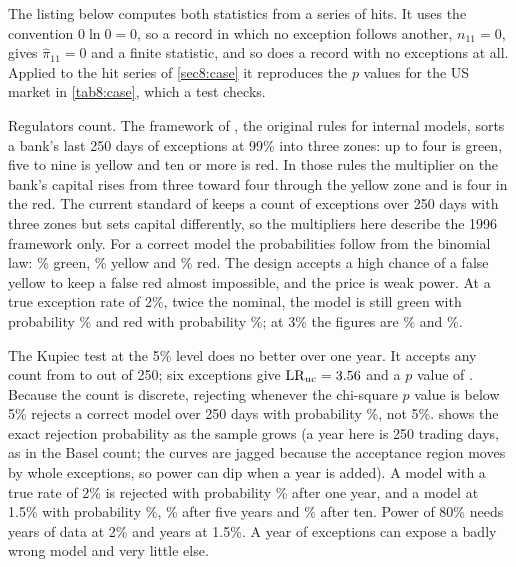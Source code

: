 \begin{chapterrefs}
The listing below computes both statistics from a series of hits. It uses the convention $0\ln0=0$, so
a record in which no exception follows another, $n_{11}=0$, gives $\hat\pi_{11}=0$ and a finite
statistic, and so does a record with no exceptions at all. Applied to the hit series of
\cref{sec8:case} it reproduces the $p$ values for the US market in \cref{tab8:case}, which a test checks.


Regulators count. The framework of \textcite{bcbs1996}, the original rules for internal models,
sorts a bank's last 250 days of exceptions at 99\% into three zones: up to four is green, five to nine
is yellow and ten or more is red. In those rules the multiplier on the bank's capital rises from three
toward four through the yellow zone and is four in the red. The current standard of \textcite{bcbs2019}
keeps a count of exceptions over 250 days with three zones but sets capital differently, so the
multipliers here describe the 1996 framework only. For a correct model the probabilities follow from the binomial law: \znGreen\% green,
\znYellow\% yellow and \znRed\% red. The design accepts a high chance of a false yellow to keep a false
red almost impossible, and the price is weak power. At a true exception rate of 2\%, twice the
nominal, the model is still green with probability \znGreenTwo\% and red with probability
\znRedTwo\%; at 3\% the figures are \znGreenThree\% and \znRedThree\%.

The Kupiec test at the 5\% level does no better over one year. It accepts any count from \kpLo{} to
\kpHi{} out of 250; six exceptions give $\mathrm{LR}_{\mathrm{uc}}=3.56$ and a $p$ value of \kpSixP.
Because the count is discrete, rejecting whenever the chi-square $p$ value is below 5\% rejects a
correct model over 250 days with probability \pwSizeOne\%, not 5\%. 
shows the exact rejection probability as the sample grows (a year here is 250 trading days, as in
the Basel count; the curves are jagged because the acceptance region moves by whole exceptions, so
power can dip when a year is added). A model with a true rate of 2\% is rejected
with probability \pwOneTwo\% after one year, and a model at 1.5\% with probability \pwOneFifteen\%,
\pwFiveFifteen\% after five years and \pwTenFifteen\% after ten. Power of 80\% needs \pwYearsTwo{}
years of data at 2\% and \pwYearsFifteen{} years at 1.5\%. A year of exceptions can expose a badly wrong
model and very little else.


\end{chapterrefs}
